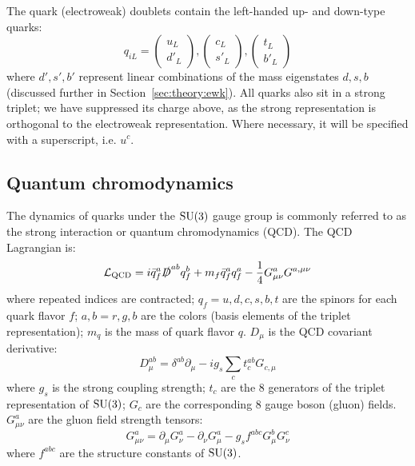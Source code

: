 The quark (electroweak) doublets contain the left-handed up- and down-type quarks:
\begin{equation}
    q_{iL} = 
    \left(\begin{matrix} u_L \\ d'_L \end{matrix}\right),
    \left(\begin{matrix} c_L \\ s'_L \end{matrix}\right),
    \left(\begin{matrix} t_L \\ b'_L \end{matrix}\right)
\end{equation}
where $d',s',b'$ represent linear combinations of the mass eigenstates $d,s,b$ (discussed further in Section~\ref{sec:theory:ewk}).
All quarks also sit in a strong triplet; we have suppressed its charge above, as the strong representation is orthogonal to the electroweak representation.
Where necessary, it will be specified with a superscript, i.e. $u^{c}$.

\subsection{Quantum chromodynamics}
The dynamics of quarks under the $\operatorname{\mathrm{SU}}(3)$ gauge group is commonly referred to as the strong interaction or quantum chromodynamics (QCD).
The QCD Lagrangian is:
\begin{equation}
    \mathcal{L}_\mathrm{QCD} = 
        i \bar q^{a}_f \slashed D^{ab} q^{b}_f  
        + m_f \bar{q}^{a}_f q^{a}_f
        - \frac{1}{4} G^{a}_{\mu\nu} G^{a,\mu\nu}
    \label{eq:theory:lqcd}
\end{equation}
where repeated indices are contracted; $q_f=u,d,c,s,b,t$ are the spinors for each quark flavor $f$; $a,b=r,g,b$ are the colors (basis elements of the triplet representation); $m_q$ is the mass of quark flavor $q$.
$D_\mu$ is the QCD covariant derivative:
\begin{equation}
    D_\mu^{ab} = \delta^{ab} \partial_\mu - i g_s \sum_c t^{ab}_c G_{c,\mu}
\end{equation}
where $g_s$ is the strong coupling strength; $t_c$ are the 8 generators of the triplet representation of $\operatorname{\mathrm{SU}}(3)$; $G_c$ are the corresponding 8 gauge boson (gluon) fields. 
$G^a_{\mu\nu}$ are the gluon field strength tensors:
\begin{equation}
    G^a_{\mu\nu} = \partial_\mu G_\nu^a - \partial_\nu G_\mu^a - g_s f^{abc} G_\mu^b G_\nu^c
\end{equation}
where $f^{abc}$ are the structure constants of $\operatorname{\mathrm{SU}}(3)$.

